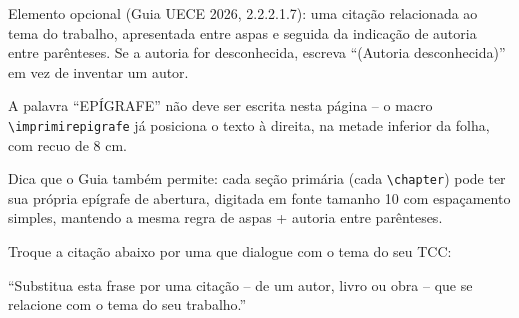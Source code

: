 Elemento opcional (Guia UECE 2026, 2.2.2.1.7): uma citação relacionada ao tema do trabalho, apresentada entre aspas e seguida da indicação de autoria entre parênteses. Se a autoria for desconhecida, escreva ``(Autoria desconhecida)'' em vez de inventar um autor.

A palavra ``EPÍGRAFE'' não deve ser escrita nesta página -- o macro \texttt{\textbackslash imprimirepigrafe} já posiciona o texto à direita, na metade inferior da folha, com recuo de 8 cm.

Dica que o Guia também permite: cada seção primária (cada \texttt{\textbackslash chapter}) pode ter sua própria epígrafe de abertura, digitada em fonte tamanho 10 com espaçamento simples, mantendo a mesma regra de aspas + autoria entre parênteses.

Troque a citação abaixo por uma que dialogue com o tema do seu TCC:

``Substitua esta frase por uma citação -- de um autor, livro ou obra -- que se relacione com o tema do seu trabalho.''


